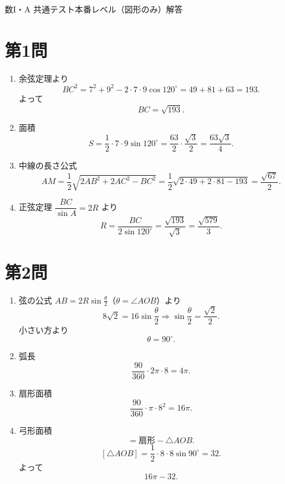 \documentclass[a4paper,12pt]{jsarticle}
\begin{document}
\begin{center}
{\LARGE 数I・A 共通テスト本番レベル（図形のみ）解答}
\end{center}

\vspace{1em}

\section*{第1問}
\begin{enumerate}[label=\arabic*.]
  \item 余弦定理より
  \[
  BC^2=7^2+9^2-2\cdot7\cdot9\cos120^\circ
  =49+81+63=193.
  \]
  よって
  \[
  BC=\sqrt{193}.
  \]
  \item 面積
  \[
  S=\frac12\cdot7\cdot9\sin120^\circ
  =\frac{63}{2}\cdot\frac{\sqrt3}{2}
  =\frac{63\sqrt3}{4}.
  \]
  \item 中線の長さ公式
  \[
  AM=\frac12\sqrt{2AB^2+2AC^2-BC^2}
  =\frac12\sqrt{2\cdot49+2\cdot81-193}
  =\frac{\sqrt{67}}{2}.
  \]
  \item 正弦定理 \( \dfrac{BC}{\sin A}=2R \) より
  \[
  R=\frac{BC}{2\sin120^\circ}
  =\frac{\sqrt{193}}{\sqrt3}
  =\frac{\sqrt{579}}{3}.
  \]
\end{enumerate}

\section*{第2問}
\begin{enumerate}[label=\arabic*.]
  \item 弦の公式 \(AB=2R\sin\frac{\theta}{2}\)（\(\theta=\angle AOB\)）より
  \[
  8\sqrt2=16\sin\frac{\theta}{2}
  \Rightarrow \sin\frac{\theta}{2}=\frac{\sqrt2}{2}.
  \]
  小さい方より
  \[
  \theta=90^\circ.
  \]
  \item 弧長
  \[
  \frac{90}{360}\cdot2\pi\cdot8=4\pi.
  \]
  \item 扇形面積
  \[
  \frac{90}{360}\cdot\pi\cdot8^2=16\pi.
  \]
  \item 弓形面積
  \[
  =\text{扇形}-\triangle AOB.
  \]
  \[
  [\triangle AOB]=\frac12\cdot8\cdot8\sin90^\circ=32.
  \]
  よって
  \[
  16\pi-32.
  \]
\end{enumerate}
\end{document}
